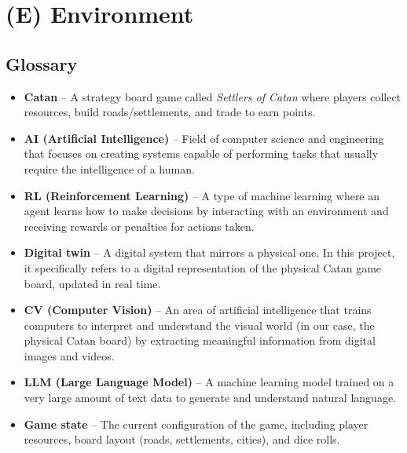 \documentclass{article}
\begin{document}
\newpage{}



\section*{(E) Environment}\label{sec:srs-environment}
\renewcommand{\thesubsection}{E.\arabic{subsection}}
\setcounter{subsection}{0}

\subsection{Glossary}\label{subsec:glossary}
\begin{itemize}
    \item \textbf{Catan} – A strategy board game called \textit{Settlers of Catan} where players collect resources, build roads/settlements, and trade to earn points.
    \item \textbf{AI (Artificial Intelligence)} – Field of computer science and engineering that focuses on creating systems capable of performing tasks that usually require the intelligence of a human.
    \item \textbf{RL (Reinforcement Learning)} – A type of machine learning where an agent learns how to make decisions by interacting with an environment and receiving rewards or penalties for actions taken.
    \item \textbf{Digital twin} – A digital system that mirrors a physical one. In this project, it specifically refers to a digital representation of the physical Catan game board, updated in real time.
    \item \textbf{CV (Computer Vision)} – An area of artificial intelligence that trains computers to interpret and understand the visual world (in our case, the physical Catan board) by extracting meaningful information from digital images and videos.
    \item \textbf{LLM (Large Language Model)} – A machine learning model trained on a very large amount of text data to generate and understand natural language.
    \item \textbf{Game state} – The current configuration of the game, including player resources, board layout (roads, settlements, cities), and dice rolls.
\end{itemize}
\end{document}
